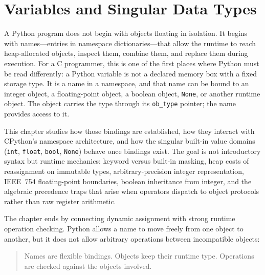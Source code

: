 \chapter{Variables and Singular Data Types}

A Python program does not begin with objects floating in isolation. It begins with names---entries in namespace dictionaries---that allow the runtime to reach heap-allocated objects, inspect them, combine them, and replace them during execution. For a C programmer, this is one of the first places where Python must be read differently: a Python variable is not a declared memory box with a fixed storage type. It is a name in a namespace, and that name can be bound to an integer object, a floating-point object, a boolean object, \texttt{None}, or another runtime object. The object carries the type through its \texttt{ob\_type} pointer; the name provides access to it.

This chapter studies how those bindings are established, how they interact with CPython's namespace architecture, and how the singular built-in value domains (\texttt{int}, \texttt{float}, \texttt{bool}, \texttt{None}) behave once bindings exist. The goal is not introductory syntax but runtime mechanics: keyword versus built-in masking, heap costs of reassignment on immutable types, arbitrary-precision integer representation, IEEE~754 floating-point boundaries, boolean inheritance from integer, and the algebraic precedence traps that arise when operators dispatch to object protocols rather than raw register arithmetic.

The chapter ends by connecting dynamic assignment with strong runtime operation checking. Python allows a name to move freely from one object to another, but it does not allow arbitrary operations between incompatible objects:

\begin{quote}
Names are flexible bindings. Objects keep their runtime type. Operations are checked against the objects involved.
\end{quote}
